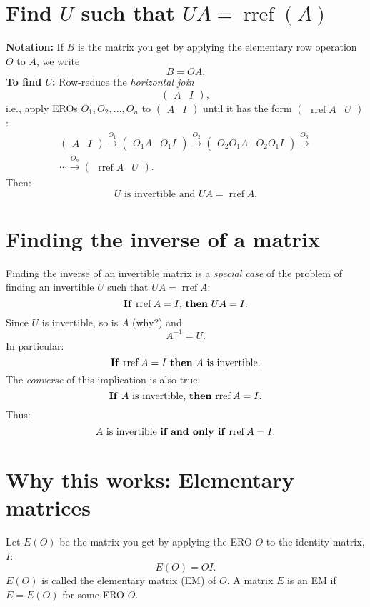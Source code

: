 \documentclass[17pt]{amsart}
\newcommand{\lra}{\longrightarrow}
\DeclareMathOperator{\rref}{rref}
\begin{document}
\section{Find $U$ such that $UA=\rref(A)$}
\textbf{Notation:} If $B$ is the matrix you get by applying the elementary row operation $O$ to $A$, we write
\[
B=OA.
\]
\textbf{To find $U$:} Row-reduce the \emph{horizontal join}
\[
\left(
\begin{array}{c|c}
A&I
\end{array}
\right),
\]
i.e., apply EROs $O_1,O_2,\ldots,O_n$ to 
$\left(
\begin{array}{c|c}
A&I
\end{array}
\right)$
until it has the form $\left(
\begin{array}{c|c}
\rref A&U
\end{array}
\right)$:
\begin{multline*}
\left(
\begin{array}{c|c}
A&I
\end{array}
\right) \overset{O_1}\lra 
\left(
\begin{array}{c|c}
O_1A&O_1I
\end{array}
\right)\overset{O_2}\lra
\left(
\begin{array}{c|c}
O_2O_1A&O_2O_1I
\end{array}
\right)\overset{O_3}
\lra\\
\cdots
\overset{O_n}\lra
\left(
\begin{array}{c|c}
\rref A&U
\end{array}
\right).
\end{multline*}
Then:
\[
\text{$U$ is invertible and $UA=\rref A$.}
\]

\section{Finding the inverse of a matrix}
Finding the inverse of an invertible matrix is a \emph{special case} of the problem of finding an invertible $U$ such that $UA=\rref A$:
\[
\text{\textbf{If} $\rref A = I$, \textbf{then}
$UA=I$.}
\]
Since $U$ is invertible, so is $A$ (why?) and
\[
A^{-1} = U.
\]
In particular:
\[
\text{\textbf{If} $\rref A=I$ \textbf{then} $A$ is invertible.}
\]
The \emph{converse} of this implication is also true:
\[
\text{\textbf{If} $A$ is invertible, \textbf{then} $\rref A=I$.}
\]
Thus:
\[
\text{$A$ is invertible \textbf{if and only if} $\rref A=I$.}
\]

\section{Why this works: Elementary matrices}
Let $E(O)$ be the matrix you get by applying the ERO $O$ to the identity matrix, $I$:
\[
E(O) = OI.
\]
$E(O)$ is called the elementary matrix (EM) of $O$. A matrix $E$ is an EM if $E=E(O)$ for some ERO $O$.
\end{document}

